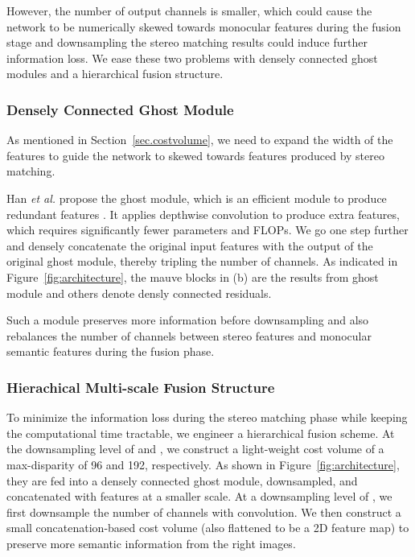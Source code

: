 \documentclass[letterpaper, 10 pt, conference]{ieeeconf}
\begin{document}
However, the number of output channels is smaller, which could cause the network to be numerically skewed towards monocular features during the fusion stage and downsampling the stereo matching results could induce further information loss.
We ease these two problems with densely connected ghost modules \cite{Han2020Ghost} and a hierarchical fusion structure.

\subsubsection{Densely Connected Ghost Module}
\label{sec.ghost}
As mentioned in Section~\ref{sec.costvolume}, we need to expand the width of the features to guide the network to skewed towards features produced by stereo matching.

Han \textit{et al.} propose the ghost module, which is an efficient module to produce redundant features \cite{Han2020Ghost}. It applies depthwise convolution to produce extra features, which requires significantly fewer parameters and FLOPs.
We go one step further and densely concatenate the original input features with the output of the original ghost module, thereby tripling the number of channels. As indicated in Figure~\ref{fig:architecture}, the mauve blocks in (b) are the results from ghost module and others denote densly connected residuals. 

Such a module preserves more information before downsampling and also rebalances the number of channels between stereo features and monocular semantic features during the fusion phase. 

\subsubsection{Hierachical Multi-scale Fusion Structure}
\label{sec.hierachical}
To minimize the information loss during the stereo matching phase while keeping the computational time tractable, we engineer a hierarchical fusion scheme.
At the downsampling level of  and , we construct a light-weight cost volume of a max-disparity of 96 and 192, respectively.
As shown in Figure~\ref{fig:architecture}, they are fed into a densely connected ghost module, downsampled, and concatenated with features at a smaller scale.
At a downsampling level of , we first downsample the number of channels with  convolution.
We then construct a small concatenation-based cost volume (also flattened to be a 2D feature map) to preserve more semantic information from the right images.
\end{document}
